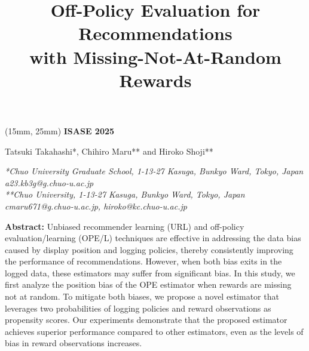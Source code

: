 \documentclass[a4paper,10pt]{article} %
\begin{document}
\title{{\fontsize{16pt}{16pt}\selectfont \textbf{Off-Policy Evaluation for Recommendations} \\ \textbf{with Missing-Not-At-Random Rewards}}}
\begin{textblock*}{20mm}(15mm, 25mm) %
    \normalsize \textbf{ISASE 2025}
\end{textblock*}
\date{}

\maketitle

\vspace{-2.7cm}

\begin{center}
    {\fontsize{12pt}{12pt}\selectfont Tatsuki Takahashi*, Chihiro Maru** and Hiroko Shoji**}
\end{center}

\begin{center}
    {\fontsize{9pt}{11pt}\selectfont 
    \textit{*Chuo University Graduate School, 1-13-27 Kasuga, Bunkyo Ward, Tokyo, Japan}\\
    \textit{a23.kb3g@g.chuo-u.ac.jp}\\
    \textit{**Chuo University, 1-13-27 Kasuga, Bunkyo Ward, Tokyo, Japan}\\
    \textit{cmaru671@g.chuo-u.ac.jp, hiroko@kc.chuo-u.ac.jp}\\
    }
\end{center}

\vspace{1em} %

{\noindent \fontsize{9pt}{9pt}\selectfont
\textbf{Abstract:} Unbiased recommender learning (URL) and off-policy evaluation/learning (OPE/L) techniques are effective in addressing the data bias caused by display position and logging policies, thereby consistently improving the performance of recommendations. However, when both bias exits in the logged data, these estimators may suffer from significant bias. In this study, we first analyze the position bias of the OPE estimator when rewards are missing not at random. To mitigate both biases, we propose a novel estimator that leverages two probabilities of logging policies and reward observations as propensity scores. Our experiments demonstrate that the proposed estimator achieves superior performance compared to other estimators, even as the levels of bias in reward observations increases.
}
\end{document}
